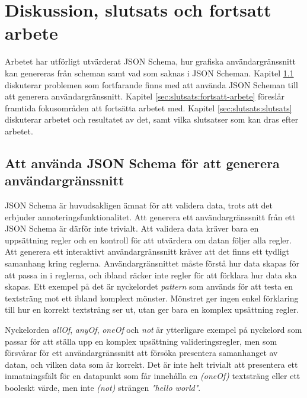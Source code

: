 \chapter{Diskussion, slutsats och fortsatt arbete}
\label{sec:slutsats}

Arbetet har utförligt utvärderat JSON Schema, hur grafiska användargränssnitt kan genereras från scheman samt vad som saknas i JSON Scheman. Kapitel \ref{sec:slutsats:json-schema} diskuterar problemen som fortfarande finns med att använda JSON Scheman till att generera användargränssnitt. Kapitel \ref{sec:slutsats:fortsatt-arbete} föreslår framtida fokusområden att fortsätta arbetet med. Kapitel \ref{sec:slutsats:slutsats} diskuterar arbetet och resultatet av det, samt vilka slutsatser som kan dras efter arbetet.


\section{Att använda JSON Schema för att generera användargränssnitt}
\label{sec:slutsats:json-schema}
JSON Schema är huvudsakligen ämnat för att validera data, trots att det erbjuder annoteringsfunktionalitet. Att generera ett användargränssnitt från ett JSON Schema är därför inte trivialt. Att validera data kräver bara en uppsättning regler och en kontroll för att utvärdera om datan följer alla regler. Att generera ett interaktivt användargränssnitt kräver att det finns ett tydligt samanhang kring reglerna. Användargränsnittet måste förstå hur data skapas för att passa in i reglerna, och ibland räcker inte regler för att förklara hur data ska skapas. Ett exempel på det är nyckelordet \textit{pattern} som används för att testa en textsträng mot ett ibland komplext mönster. Mönstret ger ingen enkel förklaring till hur en korrekt textsträng ser ut, utan ger bara en komplex upsättning regler.

Nyckelorden \textit{allOf}, \textit{anyOf}, \textit{oneOf} och \textit{not} är ytterligare exempel på nyckelord som passar för att ställa upp en komplex upsättning valideringsregler, men som försvårar för ett användargränssnitt att försöka presentera samanhanget av datan, och vilken data som är korrekt. Det är inte helt trivialt att presentera ett inmatningsfält för en datapunkt som får innehålla en \textit{(oneOf)} textsträng eller ett booleskt värde, men inte \textit{(not)} strängen \textit{"hello world"}.

